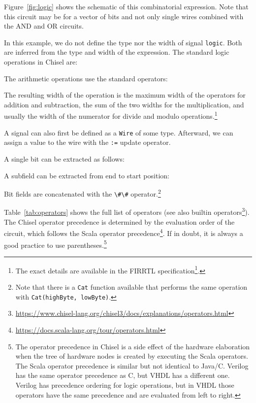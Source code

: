 \documentclass[%
    10pt,
    headinclude, footexclude,
    openright, %
    notitlepage,
    cleardoubleempty,
    headsepline,
    pointlessnumbers,
    bibtotoc, idxtotoc,
    ]{scrbook}
\newcommand{\code}[1]{{\lstinline[basicstyle=\small\ttfamily]{#1}}}
\newcommand{\codefoot}[1]{{\lstinline[basicstyle=\footnotesize\ttfamily]{#1}}}
\newcommand{\myref}[2]{\href{#1}{#2}}
\renewcommand{\myref}[2]{{#2}{\footnote{\url{#1}}}}
\begin{document}
\noindent Figure~\ref{fig:logic} shows the schematic of this combinatorial expression.
Note that this circuit may be for a vector of bits and not only single wires
combined with the AND and OR circuits.

In this example, we do not define the type nor the width of signal \code{logic}.
Both are inferred from the type and width of the expression.
The standard logic operations in Chisel are:



\noindent The arithmetic operations use the standard operators:



\noindent The resulting width of the operation is the maximum width of the operators for
addition and subtraction, the sum of the two widths for the multiplication, and usually
the width of the numerator for divide and modulo operations.\footnote{The exact
details are available in the \myref{https://github.com/chipsalliance/firrtl-spec/releases/latest/download/spec.pdf}{FIRRTL specification}.}

A signal can also first be defined as a \code{Wire} of some type. Afterward, we can assign a
value to the wire with the \code{:=} update operator.


A single bit can be extracted as follows:

\noindent A subfield can be extracted from end to start position:

\noindent Bit fields are concatenated with the \code{\#\#} operator.\footnote{Note that there is a \codefoot{Cat} function available that performs the same
operation with \codefoot{Cat(highByte, lowByte)}.}


Table~\ref{tab:operators} shows the full list of operators
(see also \myref{https://www.chisel-lang.org/chisel3/docs/explanations/operators.html}{builtin operators}).
The Chisel operator precedence is determined by the evaluation order of the circuit,
which follows the \myref{https://docs.scala-lang.org/tour/operators.html}{Scala operator precedence}.
If in doubt, it is always a good practice to use parentheses.\footnote{The operator precedence in
Chisel is a side effect of the hardware elaboration when the tree of hardware nodes
is created by executing the Scala operators. The Scala operator precedence is similar but
not identical to Java/C. Verilog has the same operator precedence as C, but VHDL
has a different one. Verilog has precedence ordering for logic operations, but in VHDL
those operators have the same precedence and are evaluated from left to right.}
\end{document}
